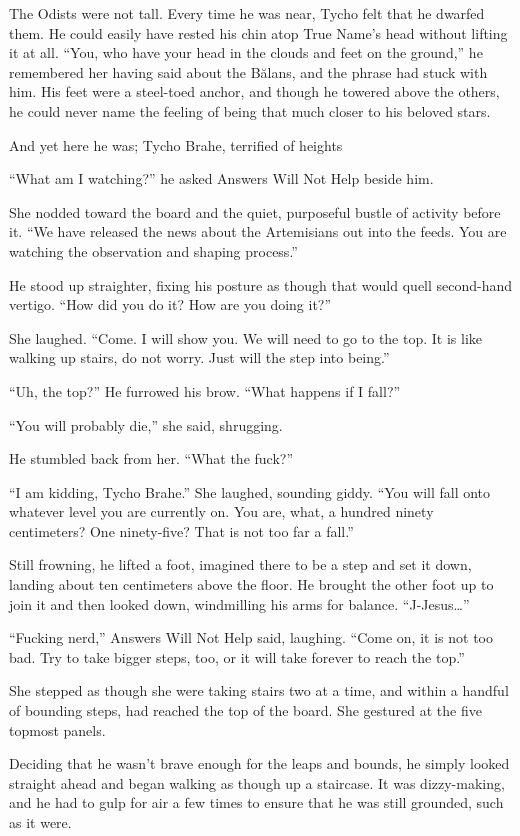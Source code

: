 The Odists were not tall. Every time he was near, Tycho felt that he dwarfed them. He could easily have rested his chin atop True Name's head without lifting it at all. ``You, who have your head in the clouds and feet on the ground,'' he remembered her having said about the Bălans, and the phrase had stuck with him. His feet were a steel-toed anchor, and though he towered above the others, he could never name the feeling of being that much closer to his beloved stars.

And yet here he was; Tycho Brahe, terrified of heights

``What am I watching?'' he asked Answers Will Not Help beside him.

She nodded toward the board and the quiet, purposeful bustle of activity before it. ``We have released the news about the Artemisians out into the feeds. You are watching the observation and shaping process.''

He stood up straighter, fixing his posture as though that would quell second-hand vertigo. ``How did you do it? How are you doing it?''

She laughed. ``Come. I will show you. We will need to go to the top. It is like walking up stairs, do not worry. Just will the step into being.''

``Uh, the top?'' He furrowed his brow. ``What happens if I fall?''

``You will probably die,'' she said, shrugging.

He stumbled back from her. ``What the fuck?''

``I am kidding, Tycho Brahe.'' She laughed, sounding giddy. ``You will fall onto whatever level you are currently on. You are, what, a hundred ninety centimeters? One ninety-five? That is not too far a fall.''

Still frowning, he lifted a foot, imagined there to be a step and set it down, landing about ten centimeters above the floor. He brought the other foot up to join it and then looked down, windmilling his arms for balance. ``J-Jesus\ldots{}''

``Fucking nerd,'' Answers Will Not Help said, laughing. ``Come on, it is not too bad. Try to take bigger steps, too, or it will take forever to reach the top.''

She stepped as though she were taking stairs two at a time, and within a handful of bounding steps, had reached the top of the board. She gestured at the five topmost panels.

Deciding that he wasn't brave enough for the leaps and bounds, he simply looked straight ahead and began walking as though up a staircase. It was dizzy-making, and he had to gulp for air a few times to ensure that he was still grounded, such as it were.

